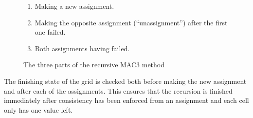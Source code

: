 \begin{figure}[H]
    \begin{framed}
        \begin{enumerate}
            \item Making a new assignment.
            \item Making the opposite assignment (``unassignment'') after the first one failed.
            \item Both assignments having failed.
        \end{enumerate}
    \end{framed}
    \caption{The three parts of the recursive MAC3 method}
    \label{fig:mac3Recursion}
\end{figure}

The finishing state of the grid is checked both before making the new assignment and after each of the assignments. This ensures that the recursion is finished immediately after consistency has been enforced from an assignment and each cell only has one value left.
